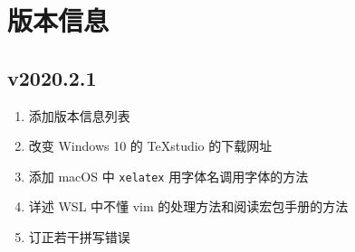 \chapter{版本信息}

\section*{v2020.2.1}

\begin{enumerate}
    \item 添加版本信息列表
    \item 改变 Windows 10 的 \TeX studio 的下载网址
    \item 添加 macOS 中 \texttt{xelatex} 用字体名调用字体的方法
    \item 详述 WSL 中不懂 vim 的处理方法和阅读宏包手册的方法
    \item 订正若干拼写错误
\end{enumerate}